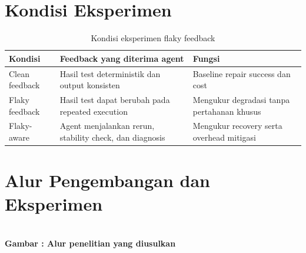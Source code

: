 \section{Kondisi Eksperimen}

\begin{table}[htbp]
\centering
\small
\caption{Kondisi eksperimen flaky feedback}
\label{tab:conditions}
\begin{tabularx}{\textwidth}{p{3.1cm}YY}
\toprule
\textbf{Kondisi} & \textbf{Feedback yang diterima agent} & \textbf{Fungsi} \\
\midrule
Clean feedback & Hasil test deterministik dan output konsisten & Baseline repair success dan cost \\
Flaky feedback & Hasil test dapat berubah pada repeated execution & Mengukur degradasi tanpa pertahanan khusus \\
Flaky-aware & Agent menjalankan rerun, stability check, dan diagnosis & Mengukur recovery serta overhead mitigasi \\
\bottomrule
\end{tabularx}
\end{table}

\section{Alur Pengembangan dan Eksperimen}

\begin{center}
\\[2mm]
\label{fig:flaky-flow}
\textbf{Gambar \thefigure: Alur penelitian yang diusulkan}
\end{center}

